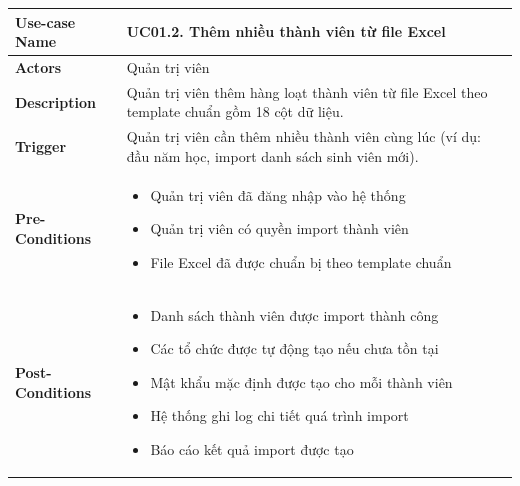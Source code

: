\begin{table}[H]
\centering
\renewcommand{\arraystretch}{1.3}
\begin{tabular}{|m{}|m{}|}
\hline
\textbf{Use-case Name} 
& \textbf{UC01.2. Thêm nhiều thành viên từ file Excel} \\ 
\hline

\textbf{Actors} 
& Quản trị viên \\ 
\hline

\textbf{Description} 
& Quản trị viên thêm hàng loạt thành viên từ file Excel theo template chuẩn gồm 18 cột dữ liệu. \\ 
\hline

\textbf{Trigger} 
& Quản trị viên cần thêm nhiều thành viên cùng lúc (ví dụ: đầu năm học, import danh sách sinh viên mới). \\ 
\hline

\textbf{Pre-Conditions} 
&
\begin{itemize}[label=--]
    \item Quản trị viên đã đăng nhập vào hệ thống
    \item Quản trị viên có quyền import thành viên
    \item File Excel đã được chuẩn bị theo template chuẩn
\end{itemize}
\\ 
\hline

\textbf{Post-Conditions} 
&
\begin{itemize}[label=--]
    \item Danh sách thành viên được import thành công
    \item Các tổ chức được tự động tạo nếu chưa tồn tại
    \item Mật khẩu mặc định được tạo cho mỗi thành viên
    \item Hệ thống ghi log chi tiết quá trình import
    \item Báo cáo kết quả import được tạo
\end{itemize}
\\ 
\hline


\end{tabular}
\end{table}
